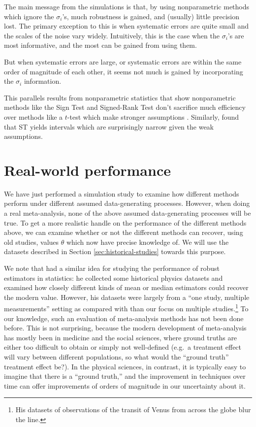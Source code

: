 \documentclass[letterpaper,12pt]{article}
\begin{document}
The main message from the simulations is that, by using nonparametric methods which ignore the $\sigma_i$'s, much robustness is gained, and (usually) little precision lost. The primary exception to this is when systematic errors are quite small and the scales of the noise vary widely. Intuitively, this is the case when the $\sigma_i$'s are most informative, and the most can be gained from using them.

But when systematic errors are large, or systematic errors are within the same order of magnitude of each other, it seems not much is gained by incorporating the $\sigma_i$ information.

This parallels results from nonparametric statistics that show nonparametric methods like the Sign Test and Signed-Rank Test don't sacrifice much efficiency over methods like a $t$-test which make stronger assumptions \citep{conover1999practical}. Similarly, \citet{gott2001median} found that ST yields intervals which are surprisingly narrow given the weak assumptions. 

\section{Real-world performance}\label{sec:realworld}

We have just performed a simulation study to examine how different methods perform under different assumed data-generating processes. However, when doing a real meta-analysis, none of the above assumed data-generating processes will be true. To get a more realistic handle on the performance of the different methods above, we can examine whether or not the different methods can recover, using old studies, values $\theta$ which now have precise knowledge of. We will use the datasets described in Section \ref{sec:historical-studies} towards this purpose.

We note that \citet{stigler1977robust} had a similar idea for studying the performance of robust estimators in statistics: he collected some historical physics datasets and examined how closely different kinds of mean or median estimators could recover the modern value. However, his datasets were largely from a ``one study, multiple measurements'' setting as compared with than our focus on multiple studies.\footnote{His datasets of observations of the transit of Venus from across the globe blur the line.} To our knowledge, such an evaluation of meta-analysis methods has not been done before. This is not surprising, because the modern development of meta-analysis has mostly been in medicine and the social sciences, where ground truths are either too difficult to obtain or simply not well-defined (e.g.~a treatment effect will vary between different populations, so what would the ``ground truth'' treatment effect be?). In the physical sciences, in contrast, it is typically easy to imagine that there is a ``ground truth,'' and the improvement in techniques over time can offer improvements of orders of magnitude in our uncertainty about it.
\end{document}
